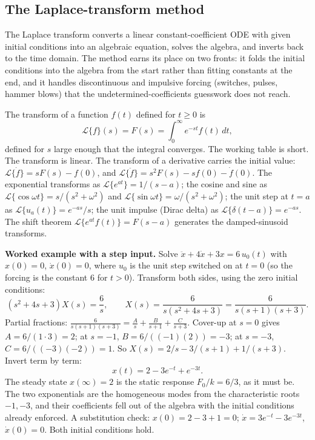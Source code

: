 \subsection{The Laplace-transform method}

The Laplace transform converts a linear constant-coefficient ODE
with given initial conditions into an algebraic equation, solves the
algebra, and inverts back to the time domain. The method earns its
place on two fronts: it folds the initial conditions into the
algebra from the start rather than fitting constants at the end, and
it handles discontinuous and impulsive forcing (switches, pulses,
hammer blows) that the undetermined-coefficients guesswork does not
reach.

The transform of a function $f(t)$ defined for $t \geq 0$ is
\[
\mathcal{L}\{f\}(s) = F(s) = \int_{0}^{\infty} e^{-st} f(t)\,dt,
\]
defined for $s$ large enough that the integral converges. The
working table is short. The transform is linear. The transform of a
derivative carries the initial value: $\mathcal{L}\{\dot{f}\} = s
F(s) - f(0)$, and $\mathcal{L}\{\ddot{f}\} = s^{2} F(s) - s f(0) -
\dot{f}(0)$. The exponential transforms as $\mathcal{L}\{e^{at}\} =
1/(s - a)$; the cosine and sine as $\mathcal{L}\{\cos\omega t\} =
s/(s^{2} + \omega^{2})$ and $\mathcal{L}\{\sin\omega t\} =
\omega/(s^{2} + \omega^{2})$; the unit step at $t = a$ as
$\mathcal{L}\{u_{a}(t)\} = e^{-as}/s$; the unit impulse (Dirac
delta) as $\mathcal{L}\{\delta(t - a)\} = e^{-as}$. The
shift theorem $\mathcal{L}\{e^{at} f(t)\} = F(s - a)$ generates the
damped-sinusoid transforms.

\textbf{Worked example with a step input.} Solve $\ddot{x} +
4\dot{x} + 3x = 6\, u_{0}(t)$ with $x(0) = 0$, $\dot{x}(0) = 0$,
where $u_{0}$ is the unit step switched on at $t = 0$ (so the forcing
is the constant $6$ for $t > 0$). Transform both sides, using the
zero initial conditions:
\[
(s^{2} + 4s + 3) X(s) = \frac{6}{s}, \qquad X(s) = \frac{6}{s(s^{2}
+ 4s + 3)} = \frac{6}{s(s + 1)(s + 3)}.
\]
Partial fractions: $\frac{6}{s(s+1)(s+3)} = \frac{A}{s} +
\frac{B}{s+1} + \frac{C}{s+3}$. Cover-up at $s = 0$ gives
$A = 6/(1 \cdot 3) = 2$; at $s = -1$, $B = 6/((-1)(2)) = -3$; at
$s = -3$, $C = 6/((-3)(-2)) = 1$. So $X(s) = 2/s - 3/(s+1) +
1/(s+3)$. Invert term by term:
\[
x(t) = 2 - 3 e^{-t} + e^{-3t}.
\]
The steady state $x(\infty) = 2$ is the static response $F_{0}/k =
6/3$, as it must be. The two exponentials are the homogeneous modes
from the characteristic roots $-1, -3$, and their coefficients fell
out of the algebra with the initial conditions already enforced. A
substitution check: $x(0) = 2 - 3 + 1 = 0$; $\dot{x} = 3 e^{-t} -
3 e^{-3t}$, $\dot{x}(0) = 0$. Both initial conditions hold.

